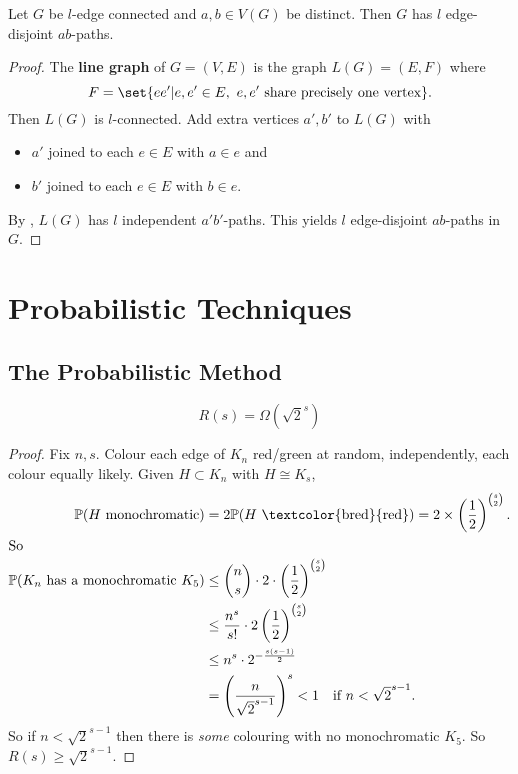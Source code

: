 \documentclass{article}
\newcommand{\red}[1]{\textcolor{bred}{#1}}
\newcommand{\green}[1]{\textcolor{bgreen}{#1}}
\begin{document}
\begin{ncor}\label{cor:36}
    Let $G$ be $l$-edge connected and $a,b \in V(G)$ be distinct.
    Then $G$ has $l$ edge-disjoint $ab$-paths.
\end{ncor}
\begin{proof}
    The \hypertarget{def:linegraph}{\textbf{line graph}} of $G=(V,E)$ is the graph $L(G) = (E,F)$ where
    \begin{equation*}
        F = \set{ee' | e,e' \in E,\ e,e' \text{ share precisely one vertex}}.
    \end{equation*}
    Then $L(G)$ is $l$-connected.
    Add extra vertices $a',b'$ to $L(G)$ with
    \begin{itemize}
        \item $a'$ joined to each $e \in E$ with $a \in e$ and
        \item $b'$ joined to each $e \in E$ with $b \in e$.
    \end{itemize}

    By , $L(G)$ has $l$ independent $a'b'$-paths.
    This yields $l$ edge-disjoint $ab$-paths in $G$.
\end{proof}
\clearpage
\section{Probabilistic Techniques}
\subsection{The Probabilistic Method}







\begin{nthm}[Erd\H{o}s]\label{thm:37}
    \begin{equation*}
        R(s) = \Omega(\sqrt{2}^s)
    \end{equation*}
\end{nthm}
\begin{proof}
    Fix $n,s$. Colour each edge of $K_n$ \red{red}/\green{green} at random, independently, each colour equally likely.
    Given $H \subset K_n$ with $H \cong K_s$,
    \begin{align*}
        \mathbb{P}(H\text{ monochromatic}) &= 2 \mathbb{P}(H\text{ \red{red}}) = 2 \times \left(\frac{1}{2}\right)^{\binom{s}{2}}. \\
        \shortintertext{So}
        \mathbb{P}(K_n \text{ has a monochromatic } K_5) &\leq \binom{n}{s} \cdot 2 \cdot \left(\frac{1}{2}\right)^{\binom{s}{2}}  \\
                                        &\leq \frac{n^s}{s!} \cdot 2 \left(\frac{1}{2}\right)^{\binom{s}{2}} \\
                                        &\leq n^s \cdot 2^{-\frac{s(s-1)}{2}} \\
                                        &= \left(\frac{n}{\sqrt{2}^{s-1}}\right)^s < 1 \quad \text{if $n < \sqrt{2}^{s-1}$.}
    \end{align*}
    So if $n < \sqrt{2}^{s-1}$ then there is \emph{some} colouring with no monochromatic $K_5$.
    So $R(s) \geq \sqrt{2}^{s-1}$.
\end{proof}
\end{document}
